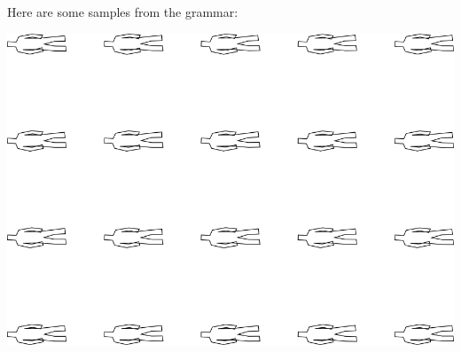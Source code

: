 Here are some samples from the grammar:

\includegraphics[width=6in]{output/3.learning/sdf_tuning/gram.0.d/samples.png}

